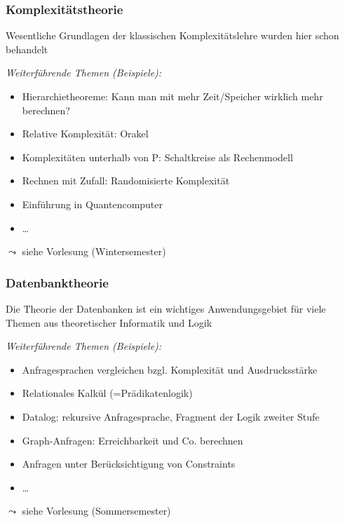 \documentclass[aspectratio=1610,onlymath]{beamer}
\begin{document}
\begin{frame}\frametitle{Komplexitätstheorie}

Wesentliche Grundlagen der klassischen Komplexitätslehre wurden hier schon behandelt
\bigskip

\emph{Weiterführende Themen (Beispiele):}
\begin{itemize}
\item Hierarchietheoreme: Kann man mit mehr Zeit/Speicher wirklich mehr berechnen?
\item Relative Komplexität: Orakel
\item Komplexitäten unterhalb von P: Schaltkreise als Rechenmodell
\item Rechnen mit Zufall: Randomisierte Komplexität
\item Einführung in Quantencomputer
\item \ldots
\end{itemize}

$\leadsto$ siehe Vorlesung  (Wintersemester)

\end{frame}

\begin{frame}\frametitle{Datenbanktheorie}

Die Theorie der Datenbanken ist ein wichtiges Anwendungsgebiet für
viele Themen aus theoretischer Informatik und Logik\bigskip

\emph{Weiterführende Themen (Beispiele):}
\begin{itemize}
\item Anfragesprachen vergleichen bzgl. Komplexität und Ausdrucksstärke
\item Relationales Kalkül (=Prädikatenlogik)
\item Datalog: rekursive Anfragesprache, Fragment der Logik zweiter Stufe
\item Graph-Anfragen: Erreichbarkeit und Co. berechnen
\item Anfragen unter Berücksichtigung von Constraints
\item \ldots
\end{itemize}

$\leadsto$ siehe Vorlesung  (Sommersemester)

\end{frame}
\end{document}
